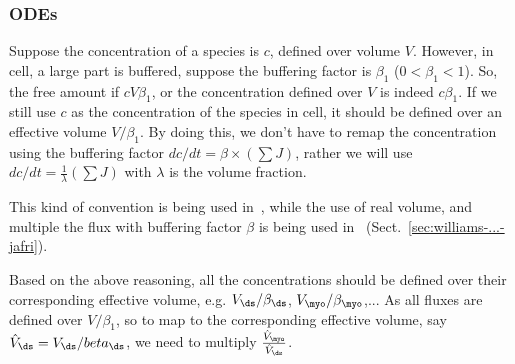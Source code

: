 

\subsubsection{ODEs}
\label{sec:ode-1}

\begin{framed}
  Suppose the concentration of a species is $c$, defined over volume
  $V$. However, in cell, a large part is buffered, suppose the
  buffering factor is $\beta_1$ ($0<\beta_1<1$). So, the free amount
  if $cV\beta_1$, or the concentration defined over $V$ is indeed
  $c\beta_1$. If we still use $c$ as the concentration of the species
  in cell, it should be defined over an effective volume
  $V/\beta_1$. By doing this, we don't have to remap the concentration
  using the buffering factor $dc/dt=\beta\times (\sum J)$, rather we
  will use $ dc/dt = \frac{1}{\lambda}(\sum J)$ with $\lambda$ is the
  volume fraction. 

  This kind of convention is being used in~\citep{williams2007pda}, while
  the use of real volume, and multiple the flux with buffering factor
  $\beta$ is being used in~\citep{williams2011}
  (Sect.~\ref{sec:williams-...-jafri}).
\end{framed}

Based on the above reasoning, all the concentrations should be defined
over their corresponding effective volume, e.g. $V_\ds/\beta_\ds$,
$V_\myo/\beta_\myo$,...  As all fluxes are defined over $V/\beta_1$,
so to map to the corresponding effective volume, say $\hat{V}_\ds
=V_\ds/beta_\ds$, we need to multiply
$\frac{\hat{V}_\myo}{\hat{V}_\ds}$. 

